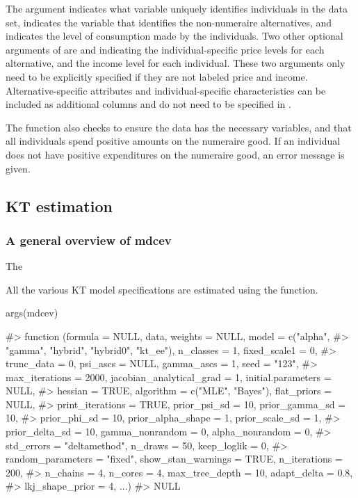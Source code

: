 The  argument indicates what variable uniquely identifies
individuals in the data set,  indicates the variable that
identifies the non-numeraire alternatives, and  indicates
the level of consumption made by the individuals. Two other optional
arguments of  are  and 
indicating the individual-specific price levels for each alternative,
and the income level for each individual. These two arguments only need
to be explicitly specified if they are not labeled price and income.
Alternative-specific attributes and individual-specific characteristics
can be included as additional columns and do not need to be specified in
.

The  function also checks to ensure the data has the
necessary variables, and that all individuals spend positive amounts on
the numeraire good. If an individual does not have positive expenditures
on the numeraire good, an error message is given.

\hypertarget{kt-estimation}{%
\subsection{KT estimation}\label{kt-estimation}}

\hypertarget{a-general-overview-of-mdcev}{%
\subsubsection{A general overview of
mdcev}\label{a-general-overview-of-mdcev}}

The 

All the various KT model specifications are estimated using the
 function.

\begin{Schunk}
\begin{Sinput}
args(mdcev)
\end{Sinput}
\begin{Soutput}
#> function (formula = NULL, data, weights = NULL, model = c("alpha", 
#>     "gamma", "hybrid", "hybrid0", "kt_ee"), n_classes = 1, fixed_scale1 = 0, 
#>     trunc_data = 0, psi_ascs = NULL, gamma_ascs = 1, seed = "123", 
#>     max_iterations = 2000, jacobian_analytical_grad = 1, initial.parameters = NULL, 
#>     hessian = TRUE, algorithm = c("MLE", "Bayes"), flat_priors = NULL, 
#>     print_iterations = TRUE, prior_psi_sd = 10, prior_gamma_sd = 10, 
#>     prior_phi_sd = 10, prior_alpha_shape = 1, prior_scale_sd = 1, 
#>     prior_delta_sd = 10, gamma_nonrandom = 0, alpha_nonrandom = 0, 
#>     std_errors = "deltamethod", n_draws = 50, keep_loglik = 0, 
#>     random_parameters = "fixed", show_stan_warnings = TRUE, n_iterations = 200, 
#>     n_chains = 4, n_cores = 4, max_tree_depth = 10, adapt_delta = 0.8, 
#>     lkj_shape_prior = 4, ...) 
#> NULL
\end{Soutput}
\end{Schunk}

